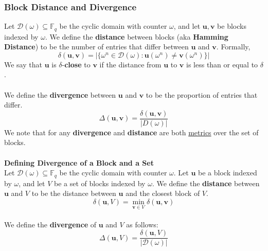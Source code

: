 \documentclass[10pt,letterpaper,titlepage]{article}
\newcommand{\GF}[1]{\mathbb{F}_{#1}}
\newcommand{\w}[0]{\omega}
\newcommand{\D}[0]{\mathcal{D}}
\theoremstyle{definition}
\begin{document}
\begin{appendices}
\subsubsection{Block Distance and Divergence}
\label{distance}
Let $\D(\w)\subseteq\GF{q}$ be the cyclic domain with counter $\w$, and let $\mathbf{u},\mathbf{v}$ be blocks indexed by $\w$.
We define the \textbf{distance} between blocks (aka \textbf{Hamming Distance}) to be the number of entries that differ between $\mathbf{u}$ and $\mathbf{v}$.
Formally,
$$\delta(\mathbf{u},\mathbf{v})=|\{\w^n\in\D(\w):\mathbf{u}(\w^n)\neq \mathbf{v}(\w^n)\}|$$
We say that $\mathbf{u}$ is $\delta$-\textbf{close} to $\mathbf{v}$ if the distance from $\mathbf{u}$ to $\mathbf{v}$ is less than or equal to $\delta$.\\
\\
We define the \textbf{divergence} between $\mathbf{u}$ and $\mathbf{v}$ to be the proportion of entries that differ.
$$\Delta(\mathbf{u},\mathbf{v})=\frac{\delta(\mathbf{u},\mathbf{v})}{|D(\w)|}$$
We note that for any \textbf{divergence} and \textbf{distance} are both \href{https://en.wikipedia.org/wiki/Metric_(mathematics)#Definition} {metrics} over the set of blocks. \\
\\
\textbf{Defining Divergence of a Block and a Set}\\
Let $\D(\w)\subseteq\GF{q}$ be the cyclic domain with counter $\w$. Let $\mathbf{u}$ be a block indexed by $\w$, and let $V$ be a set of blocks indexed by $\w$.
We define the \textbf{distance} between $\mathbf{u}$ and $V$ to be the distance between $\mathbf{u}$ and the closest block of $V$.
$$\delta(\mathbf{u},V)=\min_{\mathbf{v} \in V} \delta(\mathbf{u},\mathbf{v})$$
\\
We define the \textbf{divergence} of $\mathbf{u}$ and $V$ as follows: $$\Delta(\mathbf{u},V)=\frac{\delta(\mathbf{u},V)}{|\D(\w)|}$$
\\

\end{appendices}
\end{document}
